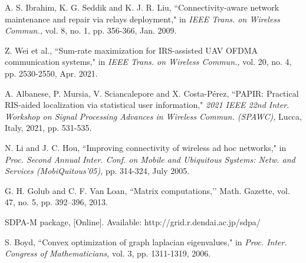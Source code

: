 \documentclass[conference]{IEEEtran}
\begin{document}
\begin{thebibliography}{00}
A. S. Ibrahim, K. G. Seddik and K. J. R. Liu, ``Connectivity-aware network maintenance and repair via relays deployment," in \emph{IEEE Trans. on Wireless Commun.,} vol. 8, no. 1, pp. 356-366, Jan. 2009.



Z. Wei et al., ``Sum-rate maximization for IRS-assisted UAV OFDMA communication systems," in \emph{IEEE Trans. on Wireless Commun.,} vol. 20, no. 4, pp. 2530-2550, Apr. 2021.

A. Albanese, P. Mursia, V. Sciancalepore and X. Costa-Pérez, ``PAPIR: Practical RIS-aided localization via statistical user information," \emph{2021 IEEE 22nd Inter. Workshop on Signal Processing Advances in Wireless Commun. (SPAWC),} Lucca, Italy, 2021, pp. 531-535.









N. Li and J. C. Hou, ``Improving connectivity of wireless ad hoc networks," in \emph{Proc. Second Annual Inter. Conf. on Mobile and Ubiquitous Systems: Netw. and Services (MobiQuitous’05),} pp. 314-324, July 2005.




G. H. Golub and C. F. Van Loan, ``Matrix computations,’’ Math. Gazette, vol. 47, no. 5, pp. 392–396, 2013.



SDPA-M package, [Online]. Available: http://grid.r.dendai.ac.jp/sdpa/

S. Boyd, ``Convex optimization of graph laplacian eigenvalues," in \emph{Proc.
Inter. Congress of Mathematicians,} vol. 3, pp. 1311-1319, 2006.

\end{thebibliography}
 
\end{document}
